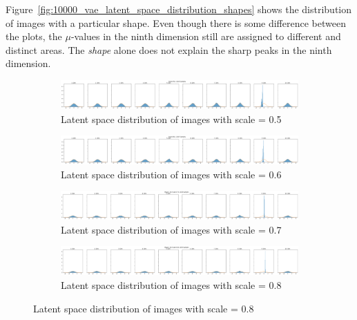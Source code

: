 Figure~\ref{fig:10000_vae_latent_space_distribution_shapes} shows the distribution of images with a particular shape.
Even though there is some difference between the plots, the $\mu$-values in the ninth dimension still are assigned to different and distinct areas.
The \textit{shape} alone does not explain the sharp peaks in the ninth dimension.

\begin{figure}
    \centering
    \begin{subfigure}{\textwidth}
        \centering
        \includegraphics[width=\textwidth]{images/latent_space_entanglement/vae_dsprites_lf_10000_dist_scale_0_5.png}
        \caption{Latent space distribution of images with scale = 0.5}
    \end{subfigure}
    \begin{subfigure}{\textwidth}
        \centering
        \includegraphics[width=\textwidth]{images/latent_space_entanglement/vae_dsprites_lf_10000_dist_scale_0_6.png}
        \caption{Latent space distribution of images with scale = 0.6}
    \end{subfigure}
    \begin{subfigure}{\textwidth}
        \centering
        \includegraphics[width=\textwidth]{images/latent_space_entanglement/vae_dsprites_lf_10000_dist_scale_0_7.png}
        \caption{Latent space distribution of images with scale = 0.7}
    \end{subfigure}
    \begin{subfigure}{\textwidth}
        \centering
        \includegraphics[width=\textwidth]{images/latent_space_entanglement/vae_dsprites_lf_10000_dist_scale_0_8.png}
        \caption{Latent space distribution of images with scale = 0.8}

\end{subfigure}
\end{figure}
